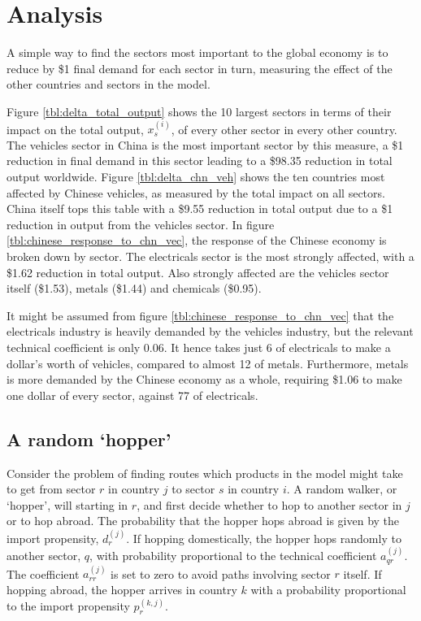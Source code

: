 \documentclass[a4paper]{article}
\begin{document}
\section{Analysis}\label{sec:analysis}
A simple way to find the sectors most important to the global economy is to reduce by \$1 final demand for each sector in turn, measuring the effect of the other countries and sectors in the model.

Figure \ref{tbl:delta_total_output} shows the 10 largest sectors in terms of their impact on the total output, $x_s^{(i)}$,  of every other sector in every other country.
The vehicles sector in China is the most important sector by this measure, a \$1 reduction in final demand in this sector leading to a \$98.35 reduction in total output worldwide. 
Figure \ref{tbl:delta_chn_veh} shows the ten countries most affected by Chinese vehicles, as measured by the total impact on all sectors.
China itself tops this table with a \$9.55 reduction in total output due to a \$1 reduction in output from the vehicles sector.
In figure \ref{tbl:chinese_response_to_chn_vec}, the response of the Chinese economy is broken down by sector.
The electricals sector is the most strongly affected, with a \$1.62 reduction in total output. Also strongly affected are the vehicles sector itself (\$1.53), metals (\$1.44) and chemicals (\$0.95).

It might be assumed from figure \ref{tbl:chinese_response_to_chn_vec} that the electricals industry is heavily demanded by the vehicles industry, but the relevant technical coefficient is only 0.06.
It hence takes just 6\textcent{}  of electricals to make a dollar's worth of vehicles, compared to almost 12\textcent{} of metals.
Furthermore, metals is more demanded by the Chinese economy as a whole, requiring \$1.06 to make one dollar of every sector, against 77\textcent{} of electricals.


\subsection*{A random `hopper'}
Consider the problem of finding routes which products in the model might take to get from sector $r$ in country $j$ to sector $s$ in country $i$.
A random walker, or `hopper', will starting in $r$, and first decide whether to hop to another sector in $j$ or to hop abroad. The probability that the hopper hops abroad is given by the import propensity, $d_r^{(j)}$.
If hopping domestically, the hopper hops randomly to another sector, $q$, with probability proportional to the technical coefficient $a_{qr}^{(j)}$.
The coefficient $a_{rr}^{(j)}$ is set to zero to avoid paths involving sector $r$ itself.
If hopping abroad, the hopper arrives in country $k$ with a probability proportional to the import propensity $p_r^{(k,j)}$.
\end{document}
